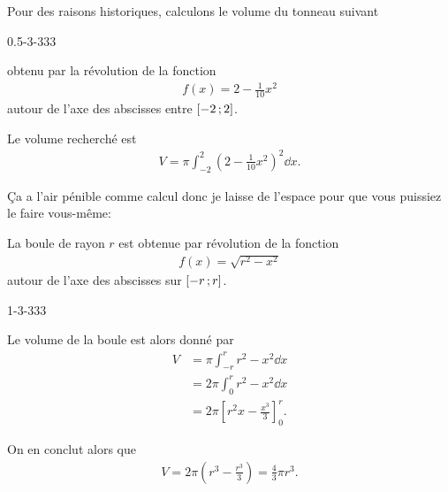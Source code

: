 \documentclass[main.tex]{subfiles}
\begin{document}
\begin{example}

    Pour des raisons historiques,
    calculons le volume du tonneau suivant
    \begin{plot}
        {0.5}{-3}{-3}{3}{3}
    \end{plot}
    obtenu par la révolution de la fonction
    \begin{align}
        f(x) = 2 -\frac 1 {10} x^2
    \end{align}
    autour de l'axe des abscisses entre $\mathopen{[}-2\,;2\mathclose{]}$.

    Le volume recherché est
    \begin{align}
        V = \pi \int_{-2}^2 \left(2 - \frac 1 {10} x^2\right)^2 \dd x.
    \end{align}

    Ça a l'air pénible comme calcul donc je laisse de l'espace pour que vous puissiez le faire vous-même:

    \vspace{10cm}
\end{example}

\begin{example}

    La boule de rayon $r$ est obtenue par révolution de la fonction
    \begin{align}
        f(x) = \sqrt {r^2 - x^2}
    \end{align}
    autour de l'axe des abscisses sur $\mathopen{[}-r\,;r\mathclose{]}$.
    \begin{plot}
        {1}{-3}{-3}{3}{3}
    \end{plot}

    Le volume de la boule est alors donné par
    \begin{align}
        V &= \pi \int_{-r}^r r^2 - x^2 \dd x\\
          &= 2 \pi \int_0^r r^2 - x^2 \dd x\\
          &= 2 \pi \left[r^2 x - \frac {x^3} 3\right]^r_0.
    \end{align}

    On en conclut alors que
    \begin{align}
        V = 2 \pi \left(r^3 - \frac {r^3} 3\right) = \frac 4 3 \pi r^3.
    \end{align}
\end{example}
\end{document}
